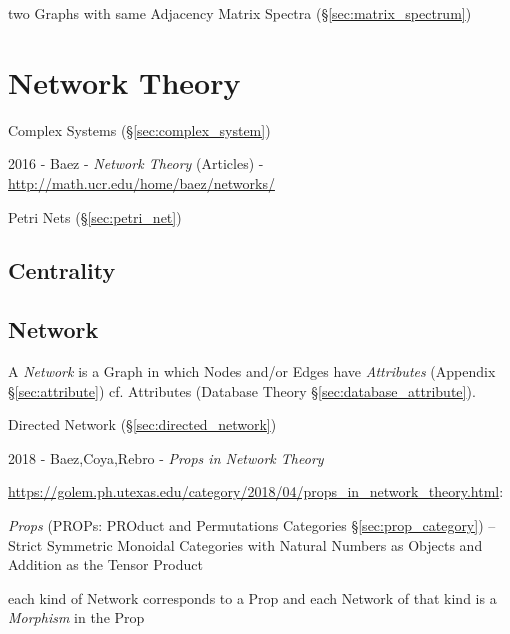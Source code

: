two Graphs with same Adjacency Matrix Spectra (\S\ref{sec:matrix_spectrum})



\section{Network Theory}\label{sec:network_theory}

Complex Systems (\S\ref{sec:complex_system})

2016 - Baez - \emph{Network Theory} (Articles) -
\url{http://math.ucr.edu/home/baez/networks/}

Petri Nets (\S\ref{sec:petri_net})



\subsection{Centrality}\label{sec:centrality}

\subsection{Network}\label{sec:network}

A \emph{Network} is a Graph in which Nodes and/or Edges have \emph{Attributes}
(Appendix \S\ref{sec:attribute}) \fist cf. Attributes (Database Theory
\S\ref{sec:database_attribute}).

\fist Directed Network (\S\ref{sec:directed_network})

\asterism

2018 - Baez,Coya,Rebro - \emph{Props in Network Theory}

\url{https://golem.ph.utexas.edu/category/2018/04/props_in_network_theory.html}:

\emph{Props} (PROPs: PROduct and Permutations Categories
\S\ref{sec:prop_category}) -- Strict Symmetric Monoidal Categories with Natural
Numbers as Objects and Addition as the Tensor Product

each kind of Network corresponds to a Prop and each Network of
that kind is a \emph{Morphism} in the Prop

